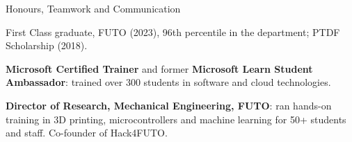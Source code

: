 \documentclass{resume}
\begin{document}
\begin{rSection}{Honours, Teamwork and Communication}
\item First Class graduate, FUTO (2023), 96th percentile in the department; PTDF Scholarship (2018).
\item \textbf{Microsoft Certified Trainer} and former \textbf{Microsoft Learn Student Ambassador}: trained over 300 students in software and cloud technologies.
\item \textbf{Director of Research, Mechanical Engineering, FUTO}: ran hands-on training in 3D printing, microcontrollers and machine learning for 50+ students and staff. Co-founder of Hack4FUTO.
\end{rSection}
\end{document}
